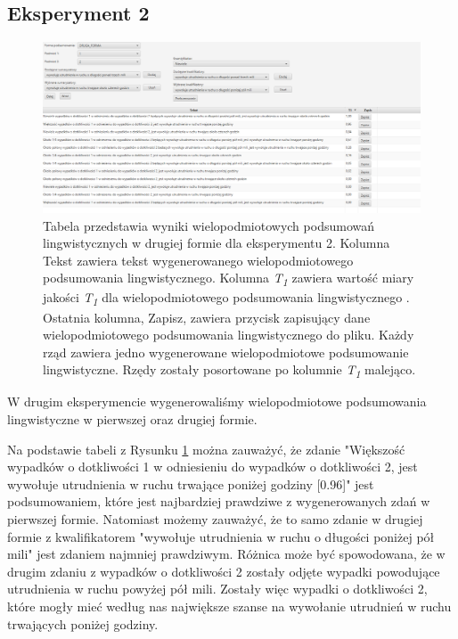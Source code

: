 \documentclass{classrep}
\begin{document}
\newpage
\subsection{Eksperyment 2}
\label{section:ex_wiel2}

\begin{figure}[h!]
\centering
\includegraphics[width=15cm]{ex_wiel2.png}
\vspace{-0.3cm}
\caption{Tabela przedstawia wyniki wielopodmiotowych podsumowań lingwistycznych w drugiej formie dla eksperymentu 2. Kolumna Tekst zawiera tekst wygenerowanego wielopodmiotowego podsumowania lingwistycznego. Kolumna \textit{T\textsubscript{1}} zawiera wartość miary jakości \textit{T\textsubscript{1}} dla wielopodmiotowego podsumowania lingwistycznego \cite{niewiadomski19}. Ostatnia kolumna, Zapisz, zawiera przycisk zapisujący dane wielopodmiotowego podsumowania lingwistycznego do pliku. Każdy rząd zawiera jedno wygenerowane wielopodmiotowe podsumowanie lingwistyczne. Rzędy zostały posortowane po kolumnie \textit{T\textsubscript{1}} malejąco. }
\label{wykr_ex_wiel2}
\end{figure}

W drugim eksperymencie wygenerowaliśmy wielopodmiotowe podsumowania lingwistyczne w pierwszej oraz drugiej formie.

Na podstawie tabeli z Rysunku \ref{wykr_ex_wiel2} można zauważyć, że zdanie "Większość wypadków o dotkliwości 1 w odniesieniu do wypadków o dotkliwości 2, jest wywołuje utrudnienia w ruchu trwające poniżej godziny [0.96]" jest podsumowaniem, które jest najbardziej prawdziwe z wygenerowanych zdań w pierwszej formie. Natomiast możemy zauważyć, że to samo zdanie w drugiej formie z kwalifikatorem "wywołuje utrudnienia w ruchu o długości poniżej pół mili" jest zdaniem najmniej prawdziwym. Różnica może być spowodowana, że w drugim zdaniu z wypadków o dotkliwości 2 zostały odjęte wypadki powodujące utrudnienia w ruchu powyżej pół mili. Zostały więc wypadki o dotkliwości 2, które mogły mieć według nas największe szanse na wywołanie utrudnień w ruchu trwających poniżej godziny.
\end{document}
